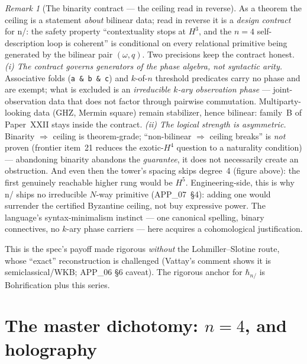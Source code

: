 \documentclass[11pt,a4paper]{article}
\newcommand{\hbarn}{\hbar_{n/}}
\theoremstyle{plain}
\theoremstyle{definition}
\theoremstyle{remark}
\newtheorem*{remark}{Remark}
\begin{document}
\begin{remark}[The binarity contract --- the ceiling read in reverse]
As a theorem the ceiling is a statement \emph{about} bilinear data; read in
reverse it is a \emph{design contract} for n/: the safety property
``contextuality stops at $H^3$, and the $n{=}4$ self-description loop is
coherent'' is conditional on every relational primitive being generated by the
bilinear pair $(\omega, q)$. Two precisions keep the contract honest.
\emph{(i) The contract governs generators of the phase algebra, not syntactic
arity.} Associative folds (\texttt{a \& b \& c}) and $k$-of-$n$ threshold
predicates carry no phase and are exempt; what is excluded is an
\emph{irreducible $k$-ary observation phase} --- joint-observation data that
does not factor through pairwise commutation. Multiparty-looking data
(GHZ, Mermin square) remain stabilizer, hence bilinear: family~B of
Paper~XXII stays inside the contract.
\emph{(ii) The logical strength is asymmetric.} Binarity $\Rightarrow$ ceiling
is theorem-grade; ``non-bilinear $\Rightarrow$ ceiling breaks'' is \emph{not}
proven (frontier item~21 reduces the exotic-$H^4$ question to a naturality
condition) --- abandoning binarity abandons the \emph{guarantee}, it does not
necessarily create an obstruction. And even then the tower's spacing skips
degree~4 (figure above): the first genuinely reachable higher rung would be
$H^5$. Engineering-side, this is why n/ ships no irreducible $N$-way
primitive (APP\_07~\S4): adding one would surrender the certified Byzantine
ceiling, not buy expressive power. The language's syntax-minimalism
instinct --- one canonical spelling, binary connectives, no $k$-ary phase
carriers --- here acquires a cohomological justification.
\end{remark}

This is the spec's payoff made rigorous \emph{without} the Lohmiller--Slotine
route, whose ``exact'' reconstruction is challenged (Vattay's comment shows it is
semiclassical/WKB; APP\_06 \S6 caveat). The rigorous anchor for $\hbarn$ is
Bohrification plus this series.

\section{\texorpdfstring{The master dichotomy: $n=4$, and holography}{The master dichotomy: n=4, and holography}}
\end{document}
